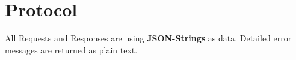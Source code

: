 \section{Protocol}

\newcommand{\returnline}[1]{\textbf{Returns:} #1}
\newcommand{\return}[2]{\textbf{Returns:} #1
  \begin{addmargin}{0.05\textwidth}
  #2
  \end{addmargin}
}
\newcommand{\param}[2]{\textbf{Request-Body:} #1
  \begin{addmargin}{0.05\textwidth}
  #2
  \end{addmargin}
}

All Requests and Responses are using \textbf{JSON-Strings} as data.
Detailed error messages are returned as plain text.













